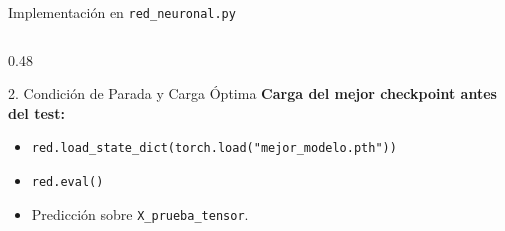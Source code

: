\documentclass[10pt,aspectratio=169]{beamer}
\begin{document}
\begin{frame}{Implementación en \texttt{red\_neuronal.py}}
\begin{columns}[T]
\begin{column}{0.48\textwidth}
\begin{block}{2. Condición de Parada y Carga Óptima}
\vspace{0.1cm}
\textbf{Carga del mejor checkpoint antes del test:}
\begin{itemize}
  \item \texttt{red.load\_state\_dict(torch.load("mejor\_modelo.pth"))}
  \item \texttt{red.eval()}
  \item Predicción sobre \texttt{X\_prueba\_tensor}.
\end{itemize}
      \end{block}
    \end{column}
  \end{columns}
\end{frame}

\end{document}
